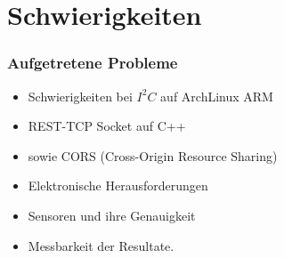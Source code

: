 \section{Schwierigkeiten}
\begin{frame}
    \frametitle{Aufgetretene Probleme}
	\begin{itemize}
        \item<1-> Schwierigkeiten bei $I^2C$ auf ArchLinux ARM
        \item<1-> REST-TCP Socket auf C++
        \item<1-> sowie CORS (Cross-Origin Resource Sharing)
        \item<2-> Elektronische Herausforderungen
        \item<2-> Sensoren und ihre Genauigkeit
        \item<2-> Messbarkeit der Resultate.
    \end{itemize}
\end{frame}